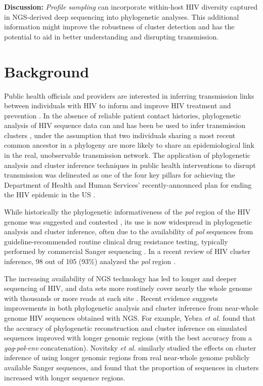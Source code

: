 \documentclass[letterpaper]{article}
\begin{document}
\textbf{Discussion:} \emph{Profile sampling} can incorporate within-host HIV diversity captured in NGS-derived deep sequencing into phylogenetic analyses. This additional information might improve the robustness of cluster detection and has the potential to aid in better understanding and disrupting transmission.

\section*{Background}

Public health officials and providers are interested in inferring transmission links between individuals with HIV to inform and improve HIV treatment and prevention \parencite{hogben}. In the absence of reliable patient contact histories, phylogenetic analysis of HIV sequence data can and has been be used to infer transmission clusters \parencite{leitner}, under the assumption that two individuals sharing a most recent common ancestor in a phylogeny are more likely to share an epidemiological link in the real, unobservable transmission network. The application of phylogenetic analysis and cluster inference techniques in public health interventions to disrupt transmission was delineated as one of the four key pillars for achieving the Department of Health and Human Services' recently-announced plan for ending the HIV epidemic in the US \parencite{fauci}.

While historically the phylogenetic informativeness of the \emph{pol} region of the HIV genome was suggested and contested \parencite{hue, sturmer}, its use is now widespread in phylogenetic analysis and cluster inference, often due to the availability of \emph{pol} sequences from guideline-recommended routine clinical drug resistance testing, typically performed by commercial Sanger sequencing \parencite{dhhs}. In a recent review of HIV cluster inference, 98 out of 105 (93\%) analyzed the \emph{pol} region \parencite{hassan}.

The increasing availability of NGS technology has led to longer and deeper sequencing of HIV, and data sets more routinely cover nearly the whole genome with thousands or more reads at each site \parencite{voelkerding}. Recent evidence suggests improvements in both phylogenetic analysis and cluster inference from near-whole genome HIV sequences obtained with NGS. For example, Yebra \emph{et al.} \parencite{yebra} found that the accuracy of phylogenetic reconstruction and cluster inference on simulated sequences improved with longer genomic regions (with the best accuracy from a \emph{gag}-\emph{pol}-\emph{env} concatenation). Novitsky \emph{et al.} \parencite{novitsky} similarly studied the effects on cluster inference of using longer genomic regions from real near-whole genome publicly available Sanger sequences, and found that the proportion of sequences in clusters increased with longer sequence regions.
\end{document}
